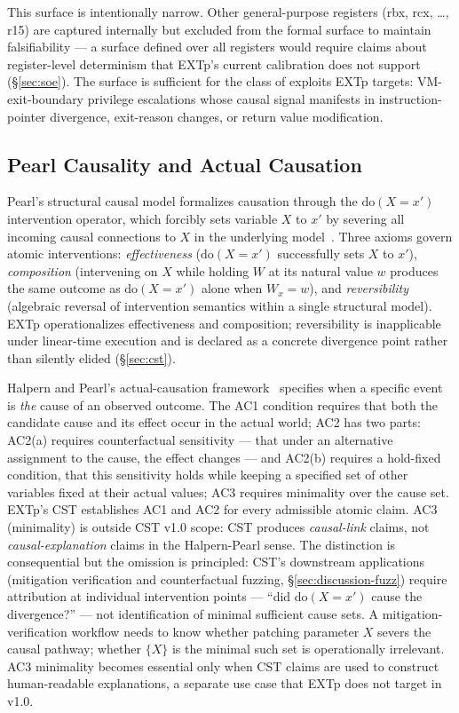 \documentclass[conference]{IEEEtran}
\newcommand{\dox}[1]{\text{do}(X{=}#1)}
\begin{document}
This surface is intentionally narrow. Other general-purpose registers
(rbx, rcx, \ldots, r15) are captured internally but excluded from the
formal surface to maintain falsifiability --- a surface defined over
all registers would require claims about register-level determinism
that EXTp's current calibration does not support (\S\ref{sec:soe}).
The surface is sufficient for the class of exploits EXTp targets:
VM-exit-boundary privilege escalations whose causal signal manifests
in instruction-pointer divergence, exit-reason changes, or return
value modification.

\subsection{Pearl Causality and Actual Causation}

Pearl's structural causal model formalizes causation through the
$\dox{x'}$ intervention operator, which forcibly sets variable $X$
to $x'$ by severing all incoming causal connections to $X$ in the
underlying model~\cite{pearl2009causality}. Three axioms govern
atomic interventions: \emph{effectiveness} ($\dox{x'}$ successfully
sets $X$ to $x'$), \emph{composition} (intervening on $X$ while
holding $W$ at its natural value $w$ produces the same outcome as
$\dox{x'}$ alone when $W_x = w$), and \emph{reversibility}
(algebraic reversal of intervention semantics within a single
structural model). EXTp operationalizes effectiveness and
composition; reversibility is inapplicable under linear-time
execution and is declared as a concrete divergence point rather than
silently elided (\S\ref{sec:cst}).

Halpern and Pearl's actual-causation
framework~\cite{halpern2005causes} specifies when a specific event
is \emph{the} cause of an observed outcome. The AC1 condition
requires that both the candidate cause and its effect occur in the
actual world; AC2 has two parts: AC2(a) requires counterfactual
sensitivity --- that under an alternative assignment to the cause,
the effect changes --- and AC2(b) requires a hold-fixed condition,
that this sensitivity holds while keeping a specified set of other
variables fixed at their actual values; AC3 requires minimality over
the cause set. EXTp's CST establishes AC1 and AC2 for every
admissible atomic claim. AC3 (minimality) is outside CST v1.0 scope:
CST produces \emph{causal-link} claims, not \emph{causal-explanation}
claims in the Halpern-Pearl sense. The distinction is consequential
but the omission is principled: CST's downstream applications
(mitigation verification and counterfactual fuzzing,
\S\ref{sec:discussion-fuzz}) require attribution at individual
intervention points --- ``did $\dox{x'}$ cause the divergence?'' ---
not identification of minimal sufficient cause sets. A
mitigation-verification workflow needs to know whether patching
parameter $X$ severs the causal pathway; whether $\{X\}$ is the
minimal such set is operationally irrelevant. AC3 minimality
becomes essential only when CST claims are used to construct
human-readable explanations, a separate use case that EXTp does
not target in v1.0.
\end{document}
